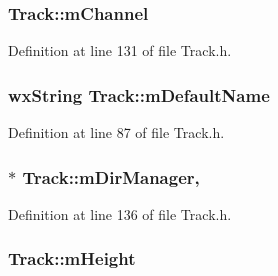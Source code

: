\subsubsection[{\texorpdfstring{m\+Channel}{mChannel}}]{ Track\+::m\+Channel\hspace{0.3cm}{\ttfamily [protected]}}\hypertarget{class_track_a95b5b00485210991a838286a6c0c3e96}{}\label{class_track_a95b5b00485210991a838286a6c0c3e96}


Definition at line 131 of file Track.\+h.

\subsubsection[{\texorpdfstring{m\+Default\+Name}{mDefaultName}}]{\setlength{\rightskip}{0pt plus 5cm}wx\+String Track\+::m\+Default\+Name\hspace{0.3cm}{\ttfamily [protected]}}\hypertarget{class_track_a711d329605d3dbda2a57d68294dc7470}{}\label{class_track_a711d329605d3dbda2a57d68294dc7470}


Definition at line 87 of file Track.\+h.

\subsubsection[{\texorpdfstring{m\+Dir\+Manager}{mDirManager}}]{$\ast$ Track\+::m\+Dir\+Manager\hspace{0.3cm}{\ttfamily [mutable]}, {\ttfamily [protected]}}\hypertarget{class_track_ac8edb91d41baf41462a0e1ee9a6c52a0}{}\label{class_track_ac8edb91d41baf41462a0e1ee9a6c52a0}


Definition at line 136 of file Track.\+h.

\subsubsection[{\texorpdfstring{m\+Height}{mHeight}}]{ Track\+::m\+Height\hspace{0.3cm}{\ttfamily [protected]}}\hypertarget{class_track_ac696598792865dc8f0d6e555ec6e1ee1}{}\label{class_track_ac696598792865dc8f0d6e555ec6e1ee1}


